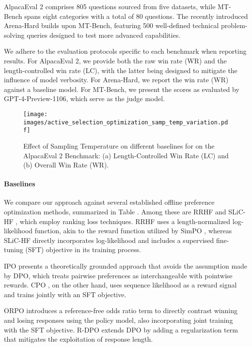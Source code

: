 AlpacaEval 2 comprises 805 questions sourced from five datasets, while MT-Bench spans eight categories with a total of 80 questions. The recently introduced Arena-Hard builds upon MT-Bench, featuring 500 well-defined technical problem-solving queries designed to test more advanced capabilities.

We adhere to the evaluation protocols specific to each benchmark when reporting results. For AlpacaEval 2, we provide both the raw win rate (WR) and the length-controlled win rate (LC), with the latter being designed to mitigate the influence of model verbosity. For Arena-Hard, we report the win rate (WR) against a baseline model. For MT-Bench, we present the scores as evaluated by GPT-4-Preview-1106, which serve as the judge model.


\begin{figure}
    \centering
\texttt{[image: images/active\_selection\_optimization\_samp\_temp\_variation.pdf]}
    \vspace{-0.25in}
    \caption{Effect of Sampling Temperature on different baselines for on the AlpacaEval 2 Benchmark: (a) Length-Controlled Win Rate (LC) and (b) Overall Win Rate (WR).}
    \label{fig:samp-temp-analysis}
\end{figure}


\paragraph{Baselines}
We compare our approach against several established offline preference optimization methods, summarized in Table . Among these are RRHF \cite{yuan2023rrhf} and SLiC-HF \cite{zhao2023slic}, which employ ranking loss techniques. RRHF uses a length-normalized log-likelihood function, akin to the reward function utilized by SimPO \cite{meng2024simpo}, whereas SLiC-HF directly incorporates log-likelihood and includes a supervised fine-tuning (SFT) objective in its training process.

IPO \cite{azar2023general} presents a theoretically grounded approach that avoids the assumption made by DPO, which treats pairwise preferences as interchangeable with pointwise rewards. CPO \cite{guo2024controllable}, on the other hand, uses sequence likelihood as a reward signal and trains jointly with an SFT objective.

ORPO \cite{hong2024orpo} introduces a reference-free odds ratio term to directly contrast winning and losing responses using the policy model, also incorporating joint training with the SFT objective. R-DPO \cite{Park2024DisentanglingLF} extends DPO by adding a regularization term that mitigates the exploitation of response length.

